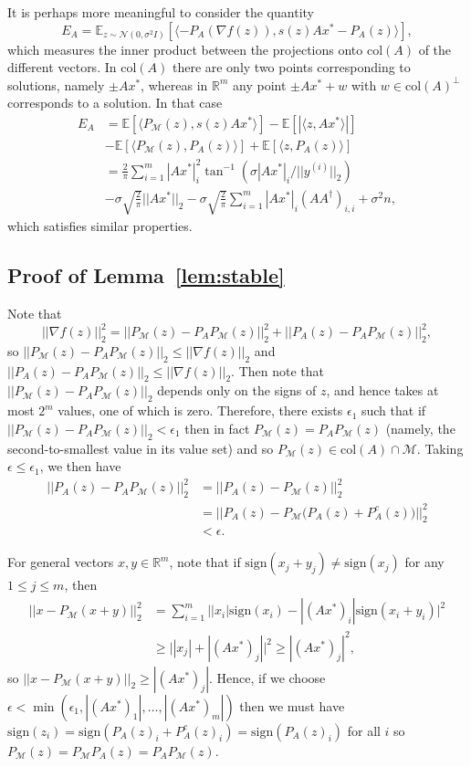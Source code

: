 \documentclass[12pt]{article}
\theoremstyle{definition}
\theoremstyle{remark}
\theoremstyle{definition}
\theoremstyle{problem}
\theoremstyle{definition}
\newcommand{\col}{\text{col}}
\newcommand{\sign}{\text{sign}}
\newcommand{\atan}{\tan^{-1}}
\newcommand{\RR}{\mathbb{R} }
\newcommand{\MM}{\mathcal{M}}
\newcommand{\EE}{\mathbb{E}}
\begin{document}
It is perhaps more meaningful to consider the quantity
\[E_A = \EE_{z\sim \mathcal{N}(0,\sigma^2I)}\left[\langle -P_A(\nabla f(z)), s(z)Ax^*-P_A(z)\rangle\right],\]
which measures the inner product between the projections onto $\col(A)$ of the different vectors. In $\col(A)$ there are only two points corresponding to solutions, namely $\pm Ax^*$, whereas in $\RR^m$ any point $\pm Ax^* + w$ with $w\in\col(A)^{\perp}$ corresponds to a solution. In that case
\[\begin{aligned} E_A &= \EE[\langle P_{\MM}(z), s(z)Ax^*\rangle] - \EE[|\langle z,Ax^*\rangle|] \\&- \EE[\langle P_{\MM}(z), P_A(z)\rangle] + \EE[\langle z,P_A(z)\rangle]\\
&= \frac{2}{\pi}\sum_{i=1}^m|Ax^*|_i^2\atan(\sigma|Ax^*|_i/||y^{(i)}||_2) \\
& - \sigma\sqrt{\frac{2}{\pi}}||Ax^*||_2- \sigma\sqrt{\frac{2}{\pi}}\sum_{i=1}^m|Ax^*|_i(AA^{\dagger})_{i,i} + \sigma^2n,\end{aligned}\]
which satisfies similar properties.

\subsection{Proof of Lemma~\ref{lem:stable}}
\label{sec:pf_stable}

Note that
\[||\nabla f(z)||_2^2 = ||P_{\MM}(z) - P_AP_{\MM}(z)||_2^2 + ||P_A(z) - P_AP_{\MM}(z)||_2^2,\]
so $||P_{\MM}(z) - P_AP_{\MM}(z)||_2\leq ||\nabla f(z)||_2$ and $||P_A(z) - P_AP_{\MM}(z)||_2\leq ||\nabla f(z)||_2$. Then note that $||P_{\MM}(z) - P_AP_{\MM}(z)||_2$ depends only on the signs of $z$, and hence takes at most $2^m$ values, one of which is zero. Therefore, there exists $\epsilon_1$ such that if $||P_{\MM}(z) - P_AP_{\MM}(z)||_2<\epsilon_1$ then in fact $P_{\MM}(z) = P_AP_{\MM}(z)$ (namely, the second-to-smallest value in its value set) and so $P_{\MM}(z)\in\col(A)\cap\MM$. Taking $\epsilon\leq \epsilon_1$, we then have
\[\begin{aligned} ||P_A(z) - P_AP_{\MM}(z)||_2^2 &= ||P_A(z) - P_{\MM}(z)||_2^2 \\&= ||P_A(z) - P_{\MM}\Big(P_A(z) + P_A^c(z)\Big)||_2^2 \\&<\epsilon.\end{aligned} \]

For general vectors $x,y\in\RR^m$, note that if $\sign(x_j+y_j)\neq \sign(x_j)$ for any $1\leq j\leq m$, then
\[\begin{aligned} ||x - P_{\MM}(x+y)||_2^2 &= \sum_{i=1}^m\Big||x_i|\sign(x_i) - |(Ax^*)_i|\sign(x_i+y_i)\Big|^2 \\& \geq \Big| |x_j| + |(Ax^*)_j|\Big|^2 \geq |(Ax^*)_j|^2,\end{aligned}\]
so $||x-P_{\MM}(x+y)||_2\geq |(Ax^*)_j|$.
Hence, if we choose $\epsilon<\min(\epsilon_1, |(Ax^*)_1|,\ldots,|(Ax^*)_m|)$ then we must have $\sign(z_i)=\sign(P_A(z)_i + P_A^c(z)_i) = \sign(P_A(z)_i)$ for all $i$ so $P_{\MM}(z) = P_{\MM}P_A(z) = P_AP_{\MM}(z)$.
\end{document}
